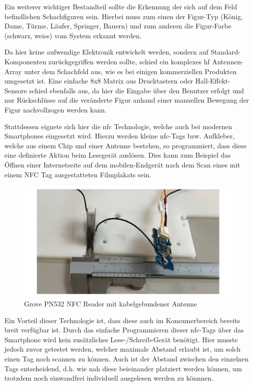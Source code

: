 Ein weiterer wichtiger Bestandteil sollte die Erkennung der sich auf dem
Feld befindlichen Schachfiguren sein. Hierbei muss zum einen der
Figur-Typ (König, Dame, Türme, Läufer, Springer, Bauern) und zum anderen
die Figur-Farbe (schwarz, weiss) vom System erkannt werden.

Da hier keine aufwendige Elektronik entwickelt werden, sondern auf
Standard-Komponenten zurückgegriffen werden sollte, schied ein komplexes
\gls{hf} Antennen-Array unter dem Schachfeld aus, wie es bei einigen
kommerziellen Produkten umgesetzt ist. Eine einfache 8x8 Matrix aus
Drucktastern oder Hall-Effekt-Sensore schied ebenfalls aus, da hier die
Eingabe über den Benutzer erfolgt und nur Rückschlüsse auf die
veränderte Figur anhand einer manuellen Bewegung der Figur nachvollzogen
werden kann.

Stattdessen eignete sich hier die \gls{nfc} Technologie, welche auch bei
modernen Smartphones eingesetzt wird. Hierzu werden kleine
\gls{nfc}-Tags bzw. Aufkleber, welche aus einem Chip und einer Antenne
bestehen, so programmiert, dass diese eine definierte Aktion beim
Lesegerät auslösen. Dies kann zum Beispiel das Öffnen einer
Internetseite auf dem mobilen-Endgerät nach dem Scan eines mit einem NFC
Tag ausgestatteten Filmplakats sein.

\begin{figure}
\centering
\includegraphics{images/ATC_nfc_range_test.png}
\caption{Grove PN532 NFC Reader mit kabelgebundener Antenne
\label{ATC_nfc_range_test}}
\end{figure}

Ein Vorteil dieser Technologie ist, dass diese auch im Konsumerbereich
bereits breit verfügbar ist. Durch das einfache Programmieren dieser
\gls{nfc}-Tags über das Smartphone wird kein zusätzliches
Lese-/Schreib-Gerät benötigt. Hier musste jedoch zuvor getestet werden,
welcher maximale Abstand erlaubt ist, um solch einen Tag noch scannen zu
können. Auch ist der Abstand zwischen den einzelnen Tags entscheidend,
d.h. wie nah diese beieinander platziert werden können, um trotzdem noch
einwandfrei individuell ausgelesen werden zu könnnen.

